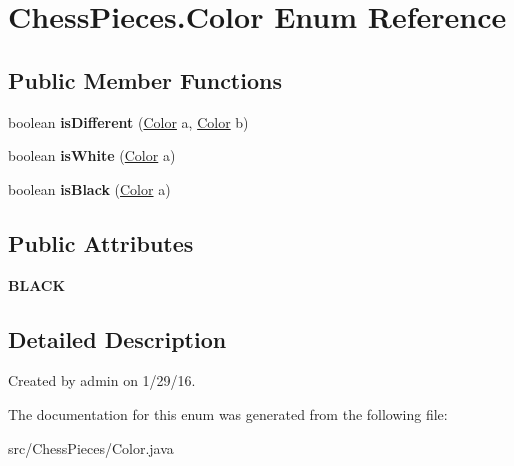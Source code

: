 \hypertarget{enum_chess_pieces_1_1_color}{}\section{Chess\+Pieces.\+Color Enum Reference}
\label{enum_chess_pieces_1_1_color}
\subsection*{Public Member Functions}
\begin{DoxyCompactItemize}
\item 
boolean {\bfseries is\+Different} (\hyperlink{enum_chess_pieces_1_1_color}{Color} a, \hyperlink{enum_chess_pieces_1_1_color}{Color} b)\hypertarget{enum_chess_pieces_1_1_color_a5df89f65494839ad057f7d816be87994}{}\label{enum_chess_pieces_1_1_color_a5df89f65494839ad057f7d816be87994}

\item 
boolean {\bfseries is\+White} (\hyperlink{enum_chess_pieces_1_1_color}{Color} a)\hypertarget{enum_chess_pieces_1_1_color_a2eb519654f92a8475317f86edc5a308b}{}\label{enum_chess_pieces_1_1_color_a2eb519654f92a8475317f86edc5a308b}

\item 
boolean {\bfseries is\+Black} (\hyperlink{enum_chess_pieces_1_1_color}{Color} a)\hypertarget{enum_chess_pieces_1_1_color_a9b804db4d208fe8544df533effb3ac36}{}\label{enum_chess_pieces_1_1_color_a9b804db4d208fe8544df533effb3ac36}

\end{DoxyCompactItemize}
\subsection*{Public Attributes}
\begin{DoxyCompactItemize}
\item 
{\bfseries B\+L\+A\+CK}\hypertarget{enum_chess_pieces_1_1_color_a5ad1081ba56bc8cb5a3e0058983ca857}{}\label{enum_chess_pieces_1_1_color_a5ad1081ba56bc8cb5a3e0058983ca857}

\end{DoxyCompactItemize}


\subsection{Detailed Description}
Created by admin on 1/29/16. 

The documentation for this enum was generated from the following file\+:\begin{DoxyCompactItemize}
\item 
src/\+Chess\+Pieces/Color.\+java\end{DoxyCompactItemize}
